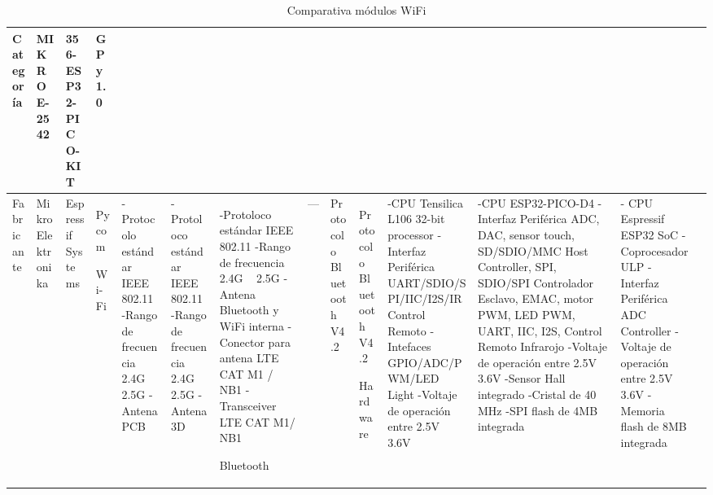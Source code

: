 \begin{longtable}{|M{2.2cm}|M{4.0cm}|M{4.0cm}|M{4.0cm}|}
    \caption{Comparativa módulos WiFi}
    \label{tabla_modulosWiFi}
	\hline
	\textbf{Categoría} & \textbf{MIKROE-2542} & \textbf{356-ESP32-PICO-KIT} & \textbf{GPy 1.0} \\ \hline
	
 	Fabricante & MikroElektronika & Espressif Systems & Pycom
 	\hline
 	 
    Wi-Fi 
    &
    \newline  -Protocolo estándar IEEE 802.11
    \newline  -Rango de frecuencia 2.4G ~ 2.5G 
    \newline  -Antena PCB
	& 
    \newline  -Protoloco estándar IEEE 802.11
    \newline  -Rango de frecuencia 2.4G ~ 2.5G 
    \newline  -Antena 3D
	&   	    
    \newline  -Protoloco estándar IEEE 802.11
    \newline  -Rango de frecuencia 2.4G ~ 2.5G 
    \newline  -Antena Bluetooth y WiFi interna
    \newline  -Conector para antena LTE CAT M1 / NB1
    \newline  -Transceiver LTE CAT M1/ NB1 	
    \hline

	Bluetooth 
    &
	---
    &
	\newline Protocolo Bluetooth V4.2
	&
	\newline Protocolo Bluetooth V4.2 
	\hline
	
	Hardware &
    \newline  -CPU Tensilica L106 32-bit processor
    \newline  -Interfaz Periférica UART/SDIO/SPI/IIC/I2S/IR Control Remoto
    \newline  -Intefaces GPIO/ADC/PWM/LED Light
    \newline  -Voltaje de operación entre 2.5V ~ 3.6V
    &
    \newline  -CPU ESP32-PICO-D4
    \newline  -Interfaz Periférica ADC, DAC, sensor touch, SD/SDIO/MMC Host Controller, SPI, SDIO/SPI Controlador Esclavo, EMAC, motor PWM, LED PWM, UART, IIC, I2S, Control Remoto Infrarojo 
    \newline  -Voltaje de operación entre 2.5V ~ 3.6V
    \newline  -Sensor Hall integrado
    \newline  -Cristal de 40 MHz
    \newline  -SPI flash de 4MB integrada
    &
    \newline  - CPU Espressif ESP32 SoC
    \newline  - Coprocesador ULP
    \newline  - Interfaz Periférica ADC Controller
    \newline  - Voltaje de operación entre 2.5V ~ 3.6V
    \newline  - Memoria flash de 8MB integrada
    &
	\hline
	

\end{longtable}
